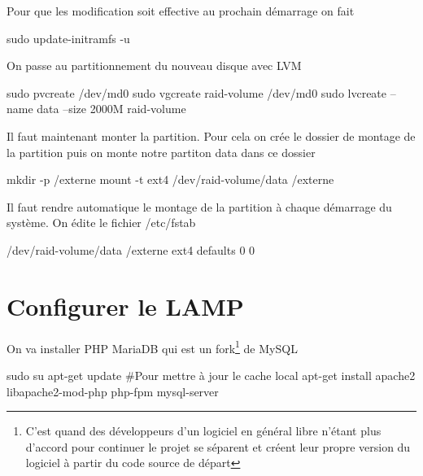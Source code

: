 \documentclass[a4paper,12pt,french]{report} %
\begin{document}
Pour que les modification soit effective au prochain démarrage on fait 
\begin{exempleConsole}
sudo update-initramfs -u
\end{exempleConsole}
On passe au partitionnement du nouveau disque avec LVM
\begin{exempleConsole}
sudo pvcreate /dev/md0
sudo vgcreate raid-volume /dev/md0 
sudo lvcreate --name data --size 2000M raid-volume
\end{exempleConsole}
Il faut maintenant monter la partition. Pour cela on crée le dossier de montage de la partition puis on monte notre partiton data dans ce dossier 
\begin{exempleConsole}
mkdir -p /externe
mount -t ext4 /dev/raid-volume/data /externe
\end{exempleConsole}
Il faut rendre automatique le montage de la partition à chaque démarrage du système. On édite le fichier /etc/fstab 
\begin{exempleConsole}
/dev/raid-volume/data /externe ext4 defaults 0 0
\end{exempleConsole}

\section{Configurer le LAMP}
On va installer PHP MariaDB qui est un fork\footnote{C'est quand des développeurs d'un logiciel en général libre n'étant plus d'accord pour continuer le projet se séparent et créent leur propre version du logiciel à partir du code source de départ} de MySQL
\begin{exempleConsole}
sudo su
apt-get update #Pour mettre à jour le cache local
apt-get install apache2 libapache2-mod-php php-fpm mysql-server
\end{exempleConsole}
\end{document}
